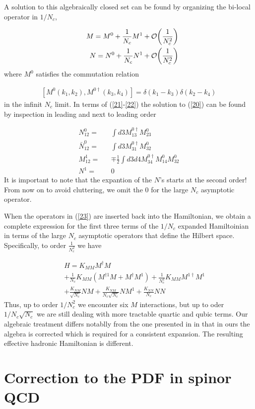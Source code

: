 \documentclass[showpacs,twocolumn,aps,preprintnumbers,letterpaper]{revtex4}
\newcommand{\be}{\begin{equation}}
\newcommand{\ee}{\end{equation}}
\def\be{\begin{eqnarray}}
\def\ee{\end{eqnarray}}
\begin{document}
A solution to this algebraically closed set can be found by  organizing the bi-local operator in $1/N_c$,

\be
\label{21}
&&M=M^{0}+\frac{1}{N_c}M^1+{\cal O}\bigg(\frac{1}{N_c^2}\bigg)\nonumber\\
&&N=N^{0}+\frac{1}{N_c}N^1+{\cal O}\bigg(\frac{1}{N_c^2}\bigg)
\ee
where $M^0$ satisfies the commutation relation 

\be
\label{22}
[M^0(k_1,k_2),M^{0\dagger}(k_3,k_4)]=\delta(k_1-k_3)\delta(k_2-k_4)
\ee
 in the infinit $N_c$ limit. In terms of (\ref{21}-\ref{22}) the solution to (\ref{20}) 
 can be found by inspection in leading and next to leading order
 
 
\be
\label{23}
N^{0}_{12}=&&\int d3 M^{0\dagger}_{13}M^0_{23}\nonumber\\ 
\bar N^{0}_{12}=&&\int d3 M^{0\dagger}_{31}M^0_{32}\nonumber\\
M^{1}_{12}=&&\mp \frac{1}{2}\int d3d4 M^{0\dagger}_{34}M^{0}_{14}M^{0}_{32}\nonumber\\
N^{1}=&&0
\ee
It is important to note that the expantion of the $N$'s starts at the second order! From now on to avoid cluttering,
we omit the 0 for the large $N_c$ asymptotic operator. 



When the operators in (\ref{23}) are inserted back into the Hamiltonian, 
we obtain a complete expression for the first three terms  of the $1/N_c$ expanded Hamiltoinian in terms 
of the large $N_c$ asymptotic operators that define the Hilbert space. Specifically, to order $\frac{1}{N_c^2}$ we have 




\be
\label{24}
&&H=K_{MM}M^{\dagger}M \nonumber \\ 
&&+\frac{1}{N_c}K_{MM}(M^{\dagger 1}M+M^{\dagger}M^1)+\frac{1}{N_c^2}K_{MM}M^{1\dagger}M^{1}\nonumber \\
&&+\frac{K_{NM}}{\sqrt{N_c}}NM+\frac{K_{NM}}{N_c\sqrt{N_c}}NM^1+\frac{K_{NN}}{N_c}NN
\ee
Thus, up to order ${1}/{N_c^2}$ we encounter six $M$ interactions, but up to oder ${1}/{N_c\sqrt{N_c}}$ we are still dealing with more tractable quartic and qubic terms. Our algebraic treatment differs notablly from the one presented in \cite{BARBON} in that in ours
the algebra is corrected which is required for a consistent expansion. The resulting effective hadronic Hamiltonian is different.




\section{Correction to the PDF  in spinor QCD}
\end{document}
